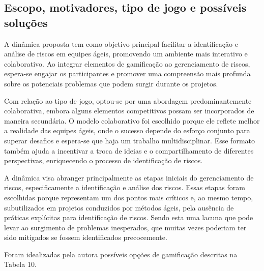 \documentclass[
	12pt,
	openright,
	twoside,
	a4paper,
	english,
	brazil
	]{abntex2}
\begin{document}
\subsection{Escopo, motivadores, tipo de jogo e possíveis soluções}

A dinâmica proposta tem como objetivo principal facilitar a identificação e análise de riscos em equipes ágeis, promovendo um ambiente mais interativo e colaborativo. Ao integrar elementos de gamificação ao gerenciamento de riscos, espera-se engajar os participantes e promover uma compreensão mais profunda sobre os potenciais problemas que podem surgir durante os projetos.

Com relação ao tipo de jogo, optou-se por uma abordagem predominantemente colaborativa, embora alguns elementos competitivos possam ser incorporados de maneira secundária. O modelo colaborativo foi escolhido porque ele reflete melhor a realidade das equipes ágeis, onde o sucesso depende do esforço conjunto para superar desafios e espera-se que haja um trabalho multidisciplinar. Esse formato também ajuda a incentivar a troca de ideias e o compartilhamento de diferentes perspectivas, enriquecendo o processo de identificação de riscos.

A dinâmica visa abranger principalmente as etapas iniciais do gerenciamento de riscos, especificamente a identificação e análise dos riscos. Essas etapas foram escolhidas porque representam um dos pontos mais críticos e, ao mesmo tempo, subutilizados em projetos conduzidos por métodos ágeis, pela ausência de práticas explícitas para identificação de riscos. Sendo esta uma lacuna que pode levar ao surgimento de problemas inesperados, que muitas vezes poderiam ter sido mitigados se fossem identificados precocemente.

Foram idealizadas pela autora possíveis opções de gamificação descritas na Tabela 10.
\end{document}
